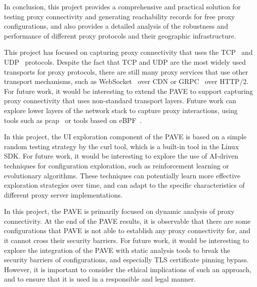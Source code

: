 \documentclass[10pt,conference]{IEEEtran}
\begin{document}
In conclusion, this project provides a comprehensive and practical solution for testing proxy connectivity and generating reachability records for free proxy configurations, and also provides a detailed analysis of the robustness and performance of different proxy protocols and their geographic infrastructure.

This project has focused on capturing proxy connectivity that uses the TCP~\cite{rfc793} and UDP~\cite{rfc768} protocols.
Despite the fact that TCP and UDP are the most widely used transports for proxy protocols, there are still many proxy services that use other transport mechanisms, such as WebSocket~\cite{rfc6455} over CDN or GRPC~\cite{grpc} over HTTP/2.
For future work, it would be interesting to extend the PAVE to support capturing proxy connectivity that uses non-standard transport layers.
Future work can explore lower layers of the network stack to capture proxy interactions, using tools such as pcap~\cite{libpcap} or tools based on eBPF~\cite{ebpf_io}.

In this project, the UI exploration component of the PAVE is based on a simple random testing strategy by the curl tool, which is a built-in tool in the Linux SDK.
For future work, it would be interesting to explore the use of AI-driven techniques for configuration exploration, such as reinforcement learning or evolutionary algorithms.
These techniques can potentially learn more effective exploration strategies over time, and can adapt to the specific characteristics of different proxy server implementations.

In this project, the PAVE is primarily focused on dynamic analysis of proxy connectivity.
At the end of the PAVE results, it is observable that there are some configurations that PAVE is not able to establish any proxy connectivity for, and it cannot cross their security barriers.
For future work, it would be interesting to explore the integration of the PAVE with static analysis tools to break the security barriers of configurations, and especially TLS certificate pinning bypass.
However, it is important to consider the ethical implications of such an approach, and to ensure that it is used in a responsible and legal manner.

\newpage



\end{document}
